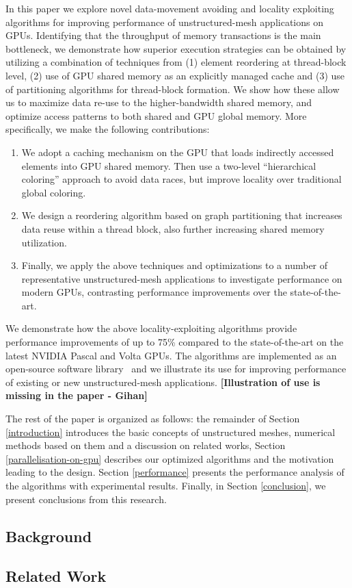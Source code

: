 In this paper we explore novel data-movement avoiding and locality exploiting 
algorithms for improving performance of unstructured-mesh applications on GPUs. 
Identifying that the throughput of memory transactions is the main bottleneck, 
we demonstrate how superior execution strategies can be obtained by utilizing 
a combination of techniques from (1) element reordering at thread-block level, 
(2) use of GPU shared memory as an explicitly managed cache and (3) use of 
partitioning algorithms for thread-block formation. We show how these allow us 
to maximize data re-use to the higher-bandwidth shared memory, and optimize 
access patterns to both shared and GPU global memory. More specifically, we make 
the following contributions:
\begin{enumerate}
\item We adopt a caching mechanism on the GPU that loads indirectly accessed 
elements into GPU shared memory. Then use a two-level ``hierarchical coloring'' 
approach to avoid data races, but improve locality over traditional global 
coloring. 

\item We design a reordering algorithm based on graph partitioning that 
increases data reuse within a thread block, also further increasing shared 
memory utilization. 

\item Finally, we apply the above techniques and optimizations to a number of 
representative unstructured-mesh applications to investigate performance on 
modern GPUs, contrasting performance improvements over the state-of-the-art. 
\end{enumerate}

\noindent We demonstrate how the above locality-exploiting algorithms provide 
performance improvements of up to 75\% compared to the state-of-the-art on the 
latest NVIDIA Pascal and Volta GPUs. The algorithms are implemented as an 
open-source software library~\cite{opt-library} and we illustrate 
its use for improving performance of existing or new unstructured-mesh 
applications. \textbf{[Illustration of use is missing in the paper - Gihan]}

The rest of the paper is organized as follows: the remainder of Section
\ref{introduction} introduces the basic concepts of unstructured meshes, 
numerical methods based on them and a discussion on related works, Section 
\ref{parallelisation-on-gpu} describes our optimized algorithms and the 
motivation leading to the design. Section \ref{performance} presents the 
performance analysis of the algorithms with experimental results. Finally, in 
Section \ref{conclusion}, we present conclusions from this research. 


\subsection{Background}\label{sec:background}


\subsection{Related Work}\label{sec:related-works}


